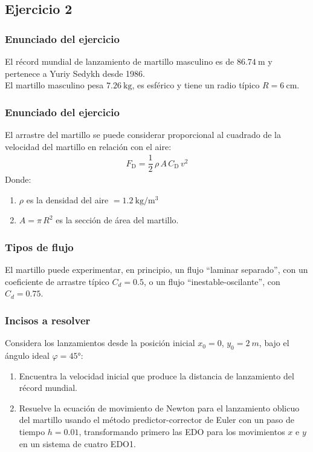 \documentclass[12pt]{beamer}
\begin{document}
\subsection{Ejercicio 2}

\begin{frame}
\frametitle{Enunciado del ejercicio}
El récord mundial de lanzamiento de martillo masculino es de $\SI{86.74}{\meter}$ y pertenece a Yuriy Sedykh desde 1986.
\\
\bigskip
\pause
El martillo masculino pesa $\SI{7.26}{\kilo\gram}$, es esférico y tiene un radio típico $R = \SI{6}{\centi\meter}$.
\end{frame}
\begin{frame}
\frametitle{Enunciado del ejercicio}
El arrastre del martillo se puede considerar proporcional al cuadrado de la velocidad del martillo en relación con el aire:
\pause
\begin{align*}
F_{\text{D}} = \dfrac{1}{2} \, \rho \, A \, C_{\text{D}} \, v^{2}
\end{align*}
\pause
Donde:
\begin{enumerate}[<+->]
\item $\rho$ es la densidad del aire $= \SI{1.2}{\kilo\gram\per\cubic\meter}$
\item $A = \pi \, R^{2}$ es la sección de área del martillo.
\end{enumerate}
\end{frame}
\begin{frame}
\frametitle{Tipos de flujo}
El martillo puede experimentar, en principio, un flujo \enquote{\textcolor{cerise}{laminar separado}}, con un coeficiente de arrastre típico $C_{d} = 0.5$, \pause o un flujo \enquote{\textcolor{cobalt}{inestable-oscilante}}, con $C_{d} = 0.75$.
\end{frame}
\begin{frame}
\frametitle{Incisos a resolver}
Considera los lanzamientos desde la posición inicial $x_{0} = 0$, $y_{0} = \SI{2}{m}$, bajo el ángulo ideal $\varphi = \ang{45}$:
\pause
{}
\begin{enumerate}[<+->]
\item Encuentra la velocidad inicial que produce la distancia de lanzamiento del récord mundial.
\item Resuelve la ecuación de movimiento de Newton para el lanzamiento oblicuo del martillo usando el método predictor-corrector de Euler con un paso de tiempo $h = 0.01$, transformando primero las EDO para los movimientos $x$ e $y$ en un sistema de cuatro EDO1.
\seti
\end{enumerate}
\end{frame}
\end{document}
